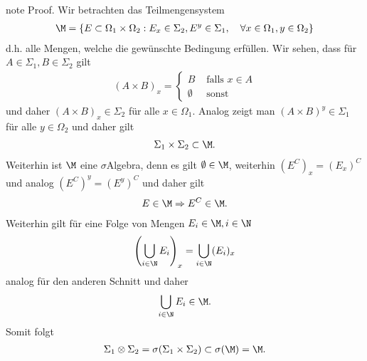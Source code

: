 \documentclass[letterpaper,10pt,german]{jupyterBook}
\begin{document}
\begin{sphinxadmonition}{note}
\sphinxAtStartPar
Proof. Wir betrachten das Teilmengensystem
\begin{equation*}
\begin{split}\M = \{E\subset\Omega_1\times\Omega_2:  E_x\in\Sigma_2, E^y\in\Sigma_1,\quad\forall x\in\Omega_1,  y\in\Omega_2\}\end{split}
\end{equation*}
\sphinxAtStartPar
d.h. alle Mengen, welche die gewünschte Bedingung erfüllen. Wir sehen, dass für \(A\in\Sigma_1,B\in\Sigma_2\) gilt
\begin{equation*}
\begin{split}(A\times B)_x = 
\begin{cases}
B &\text{ falls }x\in A\\
\emptyset &\text{ sonst}
\end{cases}\end{split}
\end{equation*}
\sphinxAtStartPar
und daher \((A\times B)_x\in\Sigma_2\) für alle \(x\in\Omega_1\). Analog zeigt man \((A\times B)^y\in\Sigma_1\) für alle \(y\in\Omega_2\) und daher gilt
\begin{equation*}
\begin{split}\Sigma_1\times\Sigma_2\subset \M.\end{split}
\end{equation*}
\sphinxAtStartPar
Weiterhin ist \(\M\) eine \(\sigma\)\sphinxhyphen{}Algebra, denn es gilt \(\emptyset\in\M\), weiterhin \((E^C)_x = (E_x)^C\)und analog \((E^C)^y= (E^y)^C\) und daher
gilt
\begin{equation*}
\begin{split}E\in\M\Rightarrow E^C\in\M.\end{split}
\end{equation*}
\sphinxAtStartPar
Weiterhin gilt für eine Folge von Mengen \(E_i\in\M,i\in\N\)
\begin{equation*}
\begin{split}\left(\bigcup_{i\in\N} E_i\right)_x = \bigcup_{i\in\N} (E_i)_x\end{split}
\end{equation*}
\sphinxAtStartPar
analog für den anderen Schnitt und daher
\begin{equation*}
\begin{split}\bigcup_{i\in\N} E_i\in\M.\end{split}
\end{equation*}
\sphinxAtStartPar
Somit folgt
\begin{equation*}
\begin{split}\Sigma_1\otimes\Sigma_2=\sigma(\Sigma_1\times\Sigma_2)\subset \sigma(\M) = \M.\end{split}
\end{equation*}\end{sphinxadmonition}
\end{document}
